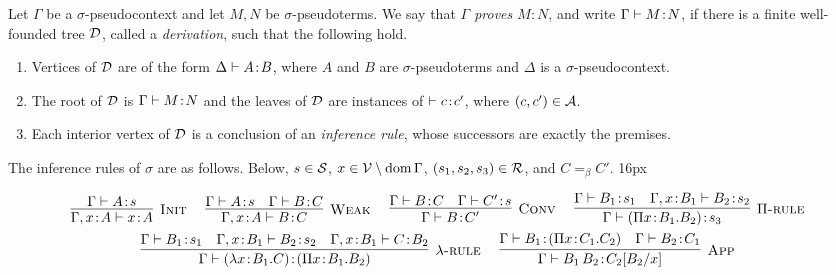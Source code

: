 \documentclass[reqno, twoside]{article}
\begin{document}
    \begin{definition}\label{rules}
        Let $\Gamma$ be a $\sigma$-pseudocontext and let $M,N$ be $\sigma$-pseudoterms. We say that \textit{$\Gamma$ proves $M\!:\!N$}, and write $\Gamma\vdash M\!:\!N$, if there is a finite well-founded tree $\mathcal{D}$, called a \textit{derivation}, such that the following hold.
        \begin{enumerate}
            \item Vertices of $\mathcal{D}$ are of the form $\Delta\vdash A\!:\!B$, where $A$ and $B$ are $\sigma$-pseudoterms and $\Delta$ is a $\sigma$-pseudocontext.
                \vspace{-0.20in}
            \item The root of $\mathcal{D}$ is $\Gamma\vdash M\!:\!N$ and the leaves of $\mathcal{D}$ are instances of $\vdash c\!:\!c'$, where $(c,c')\in\mathcal{A}$.
                \vspace{-0.05in}
            \item Each interior vertex of $\mathcal{D}$ is a conclusion of an \textit{inference rule}, whose successors are exactly the premises.
        \end{enumerate}
        The inference rules of $\sigma$ are as follows. Below, $s\in\mathcal{S}$, $x\in\mathcal{V}\setminus\operatorname{dom}\Gamma$, $(s_1,s_2,s_3)\in\mathcal{R}$, and $C=_\beta C'$.
        \hfuzz16px\begin{adjustwidth}{-8pt}{0pt}\vspace{-0.1in}
        {\small\begin{equation*}
            \begin{gathered}
                \infer[\mathsc{Init}]{\Gamma,x\!:\!A\proves x\!:\!A}{\Gamma\proves A\!:\!s}\ \ \ \ 
                \infer[\mathsc{Weak}]{\Gamma,x\!:\!A\proves B\!:\!C}{\Gamma\proves A\!:\!s & \Gamma\proves B\!:\!C}\ \ \ \ 
                \infer[\mathsc{Conv}]{\Gamma\proves B\!:\!C'}{\Gamma\proves B\!:\!C & \Gamma\proves C'\!:\!s}\ \ \ \ 
                \infer[\Pi\mathsc{-rule}]{\Gamma\proves(\Pi x\!:\!B_1.B_2)\!:\!s_3}{\Gamma\proves B_1\!:\!s_1 & \Gamma,x\!:\!B_1\proves B_2\!:\!s_2}\\
                \infer[\lambda\mathsc{-rule}]{\Gamma\proves(\lambda x\!:\!B_1.C)\!:\!(\Pi x\!:\!B_1.B_2)}{\Gamma\proves B_1\!:\!s_1 & \Gamma,x\!:\!B_1\proves B_2\!:\!s_2 & \Gamma,x\!:\!B_1\proves C\!:\!B_2}\ \ \ \ 
                \infer[\mathsc{App}]{\Gamma\proves B_1\,B_2\!:\!C_2[B_2/x]}{\Gamma\proves B_1\!:\!(\Pi x\!:\!C_1.C_2) & \Gamma\proves B_2\!:\!C_1}
            \end{gathered}
        \end{equation*}}
        \end{adjustwidth}
    \end{definition}
\end{document}
